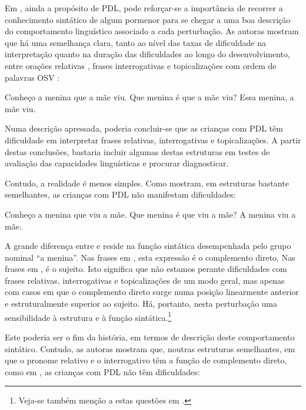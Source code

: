 \documentclass[output=paper,colorlinks,citecolor=brown,booklanguage=portuguese]{langscibook}
\begin{document}
Em \citet{Friedmann2006}, ainda a propósito de PDL, pode refor\-çar-se a importância de recorrer a conhecimento sintático de algum pormenor para se chegar a uma boa descrição do comportamento linguístico associado a cada perturbação. As autoras mostram que há uma semelhança clara, tanto ao nível das taxas de dificuldade na interpretação quanto na duração das dificuldades ao longo do desenvolvimento, entre orações relativas , frases interrogativas  e topicalizações com ordem de palavras OSV :

\ea\label{ex:cap2ex17}
        \ea\label{ex:cap2ex17a} Conheço a menina que a mãe viu.
        \ex\label{ex:cap2ex17b} Que menina é que a mãe viu?
        \ex\label{ex:cap2ex17c} Essa menina, a mãe viu.
    \z
\z

Numa descrição apressada, poderia concluir-se que as crianças com PDL têm dificuldade em interpretar frases relativas, interrogativas e topicalizações. A partir destas conclusões, bastaria incluir algumas destas estruturas em testes de avaliação das capacidades linguísticas e procurar diagnosticar.

Contudo, a realidade é menos simples. Como \citeauthor{Friedmann2006} mostram, em estruturas bastante semelhantes, as crianças com PDL não manifestam dificuldades:

\ea\label{ex:cap2ex18}
        \ea Conheço a menina que viu a mãe.
        \ex Que menina é que viu a mãe?
        \ex A menina viu a mãe.
    \z
\z

A grande diferença entre  e  reside na função sintática desempenhada pelo grupo nominal “a menina”. Nas frases em , esta expressão é o complemento direto. Nas frases em , é o sujeito. Isto significa que não estamos perante dificuldades com frases relativas, interrogativas e topicalizações de um modo geral, mas apenas com casos em que o complemento direto surge numa posição linearmente anterior e estruturalmente superior ao sujeito. Há, portanto, nesta perturbação uma sensibilidade à estrutura e à função sintática.\footnote{ Veja-se também menção a estas questões em .}  

Este poderia ser o fim da história, em termos de descrição deste comportamento sintático. Contudo, as autoras mostram que, noutras estruturas semelhantes, em que o pronome relativo e o interrogativo têm a função de complemento direto, como em , as crianças com PDL não têm dificuldades:
\end{document}
